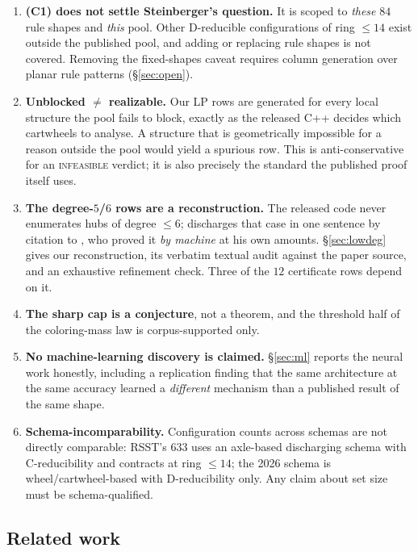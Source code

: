 \documentclass[11pt]{article}
\theoremstyle{definition}
\begin{document}
\begin{enumerate}
  \item \textbf{(C1) does not settle Steinberger's question.} It is scoped to
        \emph{these} $84$ rule shapes and \emph{this} pool. Other D-reducible
        configurations of ring $\le 14$ exist outside the published pool, and
        adding or replacing rule shapes is not covered. Removing the fixed-shapes
        caveat requires column generation over planar rule patterns
        (\S\ref{sec:open}).
  \item \textbf{Unblocked $\ne$ realizable.} Our LP rows are generated for every
        local structure the pool fails to block, exactly as the released C++ decides
        which cartwheels to analyse. A structure that is geometrically impossible
        for a reason outside the pool would yield a spurious row. This is
        anti-conservative for an \textsc{infeasible} verdict; it is also precisely
        the standard the published proof itself uses.
  \item \textbf{The degree-$5$/$6$ rows are a reconstruction.} The released code
        never enumerates hubs of degree $\le 6$; \cite{nl4ct2026} discharges that
        case in one sentence by citation to \cite{steinberger2010}, who proved it
        \emph{by machine} at his own amounts. \S\ref{sec:lowdeg} gives our
        reconstruction, its verbatim textual audit against the paper source, and an
        exhaustive refinement check. Three of the $12$ certificate rows depend on it.
  \item \textbf{The sharp cap is a conjecture}, not a theorem, and the threshold
        half of the coloring-mass law is corpus-supported only.
  \item \textbf{No machine-learning discovery is claimed.} \S\ref{sec:ml} reports
        the neural work honestly, including a replication finding that the same
        architecture at the same accuracy learned a \emph{different} mechanism than
        a published result of the same shape.
  \item \textbf{Schema-incomparability.} Configuration counts across schemas are not
        directly comparable: RSST's $633$ uses an axle-based discharging schema with
        C-reducibility and contracts at ring $\le 14$; the 2026 schema is
        wheel/cartwheel-based with D-reducibility only. Any claim about set size
        must be schema-qualified.
\end{enumerate}

\subsection{Related work}
\end{document}
